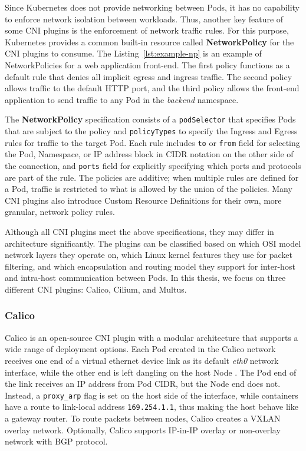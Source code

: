 \documentclass[english, 12pt, a4paper, sci, utf8, a-2b, online]{aaltothesis}
\begin{document}
Since Kubernetes does not provide networking between Pods, it has no capability to enforce network isolation between workloads.
Thus, another key feature of some CNI plugins is the enforcement of network traffic rules.
For this purpose, Kubernetes provides a common built-in resource called \textbf{NetworkPolicy} for the CNI plugins to consume.
The Listing~\ref{lst:example-np} is an example of NetworkPolicies for a web application front-end.
The first policy functions as a default rule that denies all implicit egress and ingress traffic.
The second policy allows traffic to the default HTTP port, and the third policy allows the front-end application to send traffic to any Pod in the \emph{backend} namespace.



The \textbf{NetworkPolicy} specification consists of a \lstinline{podSelector} that specifies Pods that are subject to the policy and \lstinline{policyTypes} to specify the Ingress and Egress rules for traffic \cite{budigiri2021network} to the target Pod.
Each rule includes \lstinline{to} or \lstinline{from} field for selecting the Pod, Namespace, or IP address block in CIDR notation on the other side of the connection, and \lstinline{ports} field for explicitly specifying which ports and protocols are part of the rule.
The policies are additive; when multiple rules are defined for a Pod, traffic is restricted to what is allowed by the union of the policies.
Many CNI plugins also introduce Custom Resource Definitions for their own, more granular, network policy rules.

Although all CNI plugins meet the above specifications, they may differ in architecture significantly.
The plugins can be classified based on which OSI model network layers they operate on, which Linux kernel features they use for packet filtering, and which encapsulation and routing model they support for inter-host and intra-host communication between Pods.
In this thesis, we focus on three different CNI plugins: Calico, Cilium, and Multus.

\subsubsection{Calico}

Calico \cite{calico} is an open-source CNI plugin with a modular architecture that supports a wide range of deployment options.
Each Pod created in the Calico network receives one end of a virtual ethernet device link as its default \emph{eth0} network interface, while the other end is left dangling on the host Node \cite{calico-tkng}.
The Pod end of the link receives an IP address from Pod CIDR, but the Node end does not.
Instead, a \lstinline{proxy_arp} flag is set on the host side of the interface, while containers have a route to link-local address \lstinline{169.254.1.1}, thus making the host behave like a gateway router.
To route packets between nodes, Calico creates a VXLAN overlay network.
Optionally, Calico supports IP-in-IP overlay or non-overlay network with BGP protocol.
\end{document}
